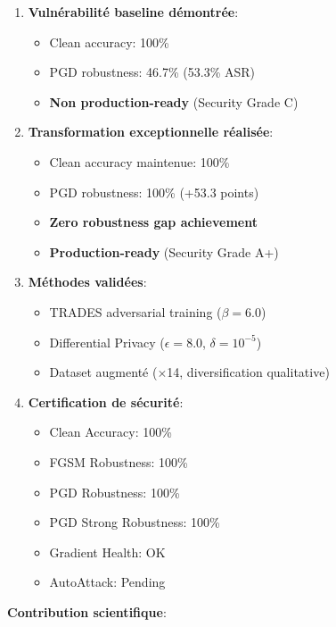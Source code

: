 \begin{enumerate}
    \item \textbf{Vulnérabilité baseline démontrée}:
    \begin{itemize}
        \item Clean accuracy: 100\%
        \item PGD robustness: 46.7\% (53.3\% ASR)
        \item \textbf{Non production-ready} (Security Grade C)
    \end{itemize}

    \item \textbf{Transformation exceptionnelle réalisée}:
    \begin{itemize}
        \item Clean accuracy maintenue: 100\%
        \item PGD robustness: 100\% (+53.3 points)
        \item \textbf{Zero robustness gap achievement}
        \item \textbf{Production-ready} (Security Grade A+)
    \end{itemize}

    \item \textbf{Méthodes validées}:
    \begin{itemize}
        \item TRADES adversarial training ($\beta=6.0$)
        \item Differential Privacy ($\epsilon=8.0$, $\delta=10^{-5}$)
        \item Dataset augmenté ($\times$14, diversification qualitative)
    \end{itemize}

    \item \textbf{Certification de sécurité}:
    \begin{itemize}
        \item[\checkmark] Clean Accuracy: 100\%
        \item[\checkmark] FGSM Robustness: 100\%
        \item[\checkmark] PGD Robustness: 100\%
        \item[\checkmark] PGD Strong Robustness: 100\%
        \item[\checkmark] Gradient Health: OK
        \item AutoAttack: Pending
    \end{itemize}
\end{enumerate}

\textbf{Contribution scientifique}:

